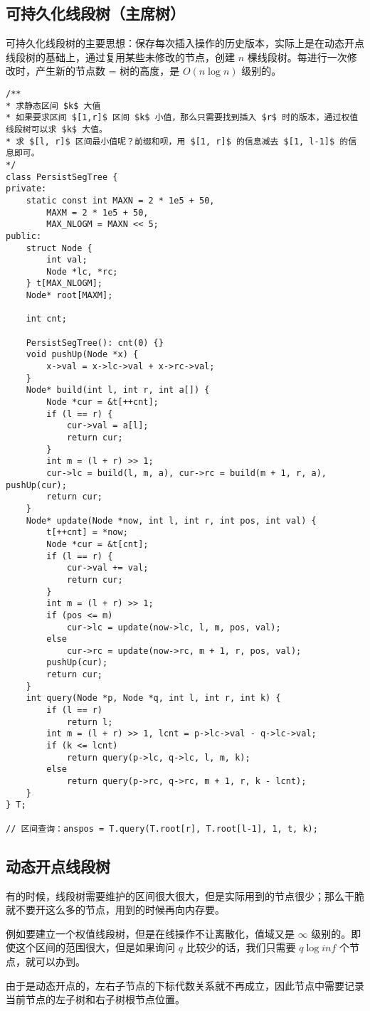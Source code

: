 \subsection{可持久化线段树（主席树）}
\par 可持久化线段树的主要思想：保存每次插入操作的历史版本，实际上是在动态开点线段树的基础上，通过复用某些未修改的节点，创建 $n$ 棵线段树。每进行一次修改时，产生新的节点数 = 树的高度，是 $O(n\log n)$ 级别的。
\begin{verbatim}
/**
* 求静态区间 $k$ 大值
* 如果要求区间 $[1,r]$ 区间 $k$ 小值，那么只需要找到插入 $r$ 时的版本，通过权值线段树可以求 $k$ 大值。
* 求 $[l, r]$ 区间最小值呢？前缀和呗，用 $[1, r]$ 的信息减去 $[1, l-1]$ 的信息即可。
*/
class PersistSegTree {
private:
    static const int MAXN = 2 * 1e5 + 50,
        MAXM = 2 * 1e5 + 50,
        MAX_NLOGM = MAXN << 5;
public:
    struct Node {
        int val;
        Node *lc, *rc;
    } t[MAX_NLOGM];
    Node* root[MAXM];
    
    int cnt;
    
    PersistSegTree(): cnt(0) {}
    void pushUp(Node *x) {
        x->val = x->lc->val + x->rc->val;
    }
    Node* build(int l, int r, int a[]) {
        Node *cur = &t[++cnt];
        if (l == r) {
            cur->val = a[l];
            return cur;
        }
        int m = (l + r) >> 1;
        cur->lc = build(l, m, a), cur->rc = build(m + 1, r, a), pushUp(cur);
        return cur;
    }
    Node* update(Node *now, int l, int r, int pos, int val) {
        t[++cnt] = *now;
        Node *cur = &t[cnt];
        if (l == r) {
            cur->val += val;
            return cur;
        }
        int m = (l + r) >> 1;
        if (pos <= m)
            cur->lc = update(now->lc, l, m, pos, val);
        else
            cur->rc = update(now->rc, m + 1, r, pos, val);
        pushUp(cur);
        return cur;
    }
    int query(Node *p, Node *q, int l, int r, int k) {
        if (l == r)
            return l;
        int m = (l + r) >> 1, lcnt = p->lc->val - q->lc->val;
        if (k <= lcnt)
            return query(p->lc, q->lc, l, m, k);
        else
            return query(p->rc, q->rc, m + 1, r, k - lcnt);
    }
} T;

// 区间查询：anspos = T.query(T.root[r], T.root[l-1], 1, t, k);
\end{verbatim}

\subsection{动态开点线段树}
\par\noindent 有的时候，线段树需要维护的区间很大很大，但是实际用到的节点很少；那么干脆就不要开这么多的节点，用到的时候再向内存要。
\par\noindent 例如要建立一个权值线段树，但是在线操作不让离散化，值域又是 $\infty$ 级别的。即使这个区间的范围很大，但是如果询问 $q$ 比较少的话，我们只需要 $q \log inf$ 个节点，就可以办到。
\par\noindent 由于是动态开点的，左右子节点的下标代数关系就不再成立，因此节点中需要记录当前节点的左子树和右子树根节点位置。

